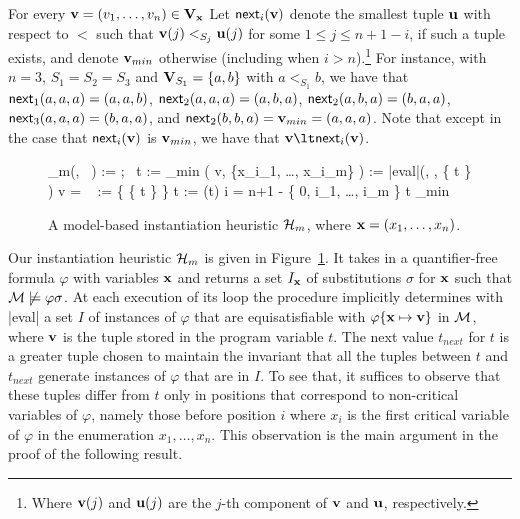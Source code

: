\documentclass{svjour3}                     %
\begin{document}
For every $\mathbf{v} = (v_1, \ldots, v_n) \in \mathbf{V}_{\mathbf{x}}$
Let $\mathsf{next}_{i}(\mathbf{v})$ denote the smallest tuple $\mathbf{u}$ with respect to $<$ such that 
$\mathbf{v}(j) <_{S_j} \mathbf{u}(j)$ for some $1 \leq j \leq n+1-i$,
if such a tuple exists, and denote ${\mathbf{v}}_{min}$ otherwise
(including when $i > n$).\footnote{%
Where $\mathbf{v}(j)$ and $\mathbf{u}(j)$ are the $j$-th component of $\mathbf{v}$ and $\mathbf{u}$,
respectively.
}
For instance, with $n = 3$, $S_1 = S_2 = S_3$ and 
$\mathbf{V}_{S_1} = \{a,b\}$ with $a <_{S_1} b$, we have that
$\mathsf{next}_{1}(a,a,a) = (a,a,b)$, $\mathsf{next}_{2}(a,a,a) = (a,b,a)$, 
$\mathsf{next}_{2}(a,b,a) = (b,a,a)$, $\mathsf{next}_{3}(a,a,a) = (b,a,a)$, 
and $\mathsf{next}_{2}(b,b,a) = {\mathbf{v}}_{min} = (a,a,a)$.
Note that except in the case that $\mathsf{next}_{i}(\mathbf{v})$ is ${\mathbf{v}}_{min}$, we have that $\tupl{v} \lt \next{i}(\tupl{v})$.

\begin{figure}[t]
\begin{program}
\PROC \He_{m}(\M, \forall {}\, \varphi) \BODY
   := \emptyset; \
  t := {}_{min}
  \LOOPDO
    ( v, \{x_{i_1}, \ldots, x_{i_m}\} ) := |eval|(\M, \varphi, \{  \mapsto t \} )
    \IF v = \false \THEN \
      \instans{} := \instans{\tupl{x}} \cup \{ \{ \tupl{x} \mapsto t \} \}
    \FI
    t := \next{i}(t) \text{ where } i = n+1 - \maxf \{ 0, i_1, \ldots, i_m \}
  \ENDLOOPDO t _{min}
  \RETURN \instans{\tupl{x}}
\ENDPROC
\end{program}
\vspace{-2ex}

\caption{
A model-based instantiation heuristic $\mathcal{H}_{m}$, where $\mathbf{x} = (x_1, \ldots, x_n)$.
}
\label{fig:choose}
\end{figure}

Our instantiation heuristic $\mathcal{H}_{m}$ is given in Figure~\ref{fig:choose}.
It takes in a quantifier-free formula $\varphi$ 
with variables $\mathbf{x}$ and 
returns a set $I_{\mathbf{x}}$ of substitutions $\sigma$ for $\mathbf{x}$
such that $\mathcal{M} \not\models \varphi\sigma$.
At each execution of its loop
the procedure implicitly determines with |eval| 
a set $I$ of instances of $\varphi$ 
that are equisatisfiable with $\varphi\{\mathbf{x} \mapsto \mathbf{v}\}$ in $\mathcal{M}$,
where $\mathbf{v}$ is the tuple stored in the program variable $t$.
The next value $t_{next}$ for $t$ is a greater tuple chosen to maintain
the invariant that all the tuples between $t$ and $t_{next}$ generate
instances of $\varphi$ that are in $I$.
To see that, it suffices to observe that 
these tuples differ from $t$ only in positions
that correspond to non-critical variables of $\varphi$,
namely those before position $i$ where $x_i$ is the first critical variable 
of $\varphi$ in the enumeration $x_1, \ldots, x_n$.
This observation is the main argument in the proof of the following result.
\end{document}
